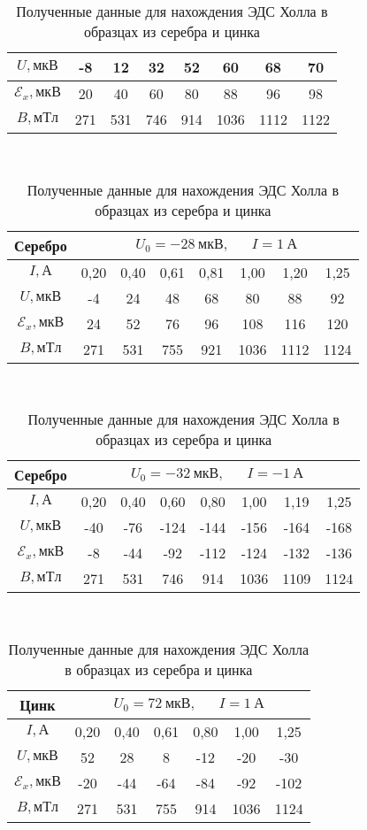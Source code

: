 \documentclass{lab}
\begin{document}
\begin{itemize}
\begin{table}[H]
{\begin{tabular}{|c|ccccccc|}
	$U, мкВ$	&	-8	&	12	&	32	&	52	&	60	&	68	&	70	\\ \hline
	$\mathscr{E}_x, мкВ$	&	20	&	40	&	60	&	80	&	88	&	96	&	98	\\ \hline
	$B, мТл$	&	271	&	531	&	746	&	914	&	1036	&	1112	&	1122	\\ \hline
\end{tabular}
\\[0.1cm]
\begin{tabular}{|c|ccccccc|}
	\hline
	Серебро & \multicolumn{7}{c|}{$ U_0 = -28~мкВ, ~~~~~~~ I = 1~А $} \\ \hline
	$I, А$	&	0,20	&	0,40	&	0,61	&	0,81	&	1,00	&	1,20	&	1,25	\\ \hline
	$U, мкВ$	&	-4	&	24	&	48	&	68	&	80	&	88	&	92	\\ \hline
	$\mathscr{E}_x, мкВ$	&	24	&	52	&	76	&	96	&	108	&	116	&	120	\\ \hline
	$B, мТл$	&	271	&	531	&	755	&	921	&	1036	&	1112	&	1124	\\ \hline
\end{tabular}
\\[0.1cm]
\begin{tabular}{|c|ccccccc|}
	\hline
	Серебро & \multicolumn{7}{c|}{$ U_0 = -32~мкВ, ~~~~~~~ I = -1~А $} \\ \hline
	$I, А$	&	0,20	&	0,40	&	0,60	&	0,80	&	1,00	&	1,19	&	1,25	\\ \hline
	$U, мкВ$	&	-40	&	-76	&	-124	&	-144	&	-156	&	-164	&	-168	\\ \hline
	$\mathscr{E}_x, мкВ$	&	-8	&	-44	&	-92	&	-112	&	-124	&	-132	&	-136	\\ \hline
	$B, мТл$	&	271	&	531	&	746	&	914	&	1036	&	1109	&	1124	\\ \hline
\end{tabular}
\\[0.1cm]
\begin{tabular}{|c|cccccc|}
	\hline
	Цинк & \multicolumn{6}{c|}{$ U_0 = 72~мкВ, ~~~~~~~ I = 1~А $} \\ \hline
	$I, А$	&	0,20	&	0,40	&	0,61	&	0,80	&	1,00	&	1,25	\\ \hline
	$U, мкВ$	&	52	&	28	&	8	&	-12	&	-20	&	-30	\\ \hline
	$\mathscr{E}_x, мкВ$	&	-20	&	-44	&	-64	&	-84	&	-92	&	-102	\\ \hline
	$B, мТл$	&	271	&	531	&	755	&	914	&	1036	&	1124	\\ \hline
\end{tabular}
}
	\caption{\footnotesize Полученные данные для нахождения ЭДС Холла в образцах из серебра и цинка}
	\label{tabBig}
	\renewcommand{\arraystretch}{1}
\end{table}


\end{itemize}
\end{document}
